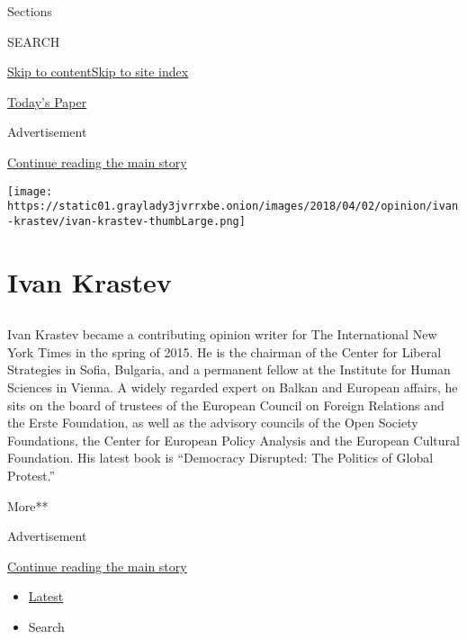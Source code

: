 Sections

SEARCH

\protect\hyperlink{site-content}{Skip to
content}\protect\hyperlink{site-index}{Skip to site index}

\href{https://myaccount.nytimes3xbfgragh.onion/auth/login?response_type=cookie\&client_id=vi}{}

\href{https://www.nytimes3xbfgragh.onion/section/todayspaper}{Today's
Paper}

Advertisement

\protect\hyperlink{after-top}{Continue reading the main story}

\texttt{[image: https://static01.graylady3jvrrxbe.onion/images/2018/04/02/opinion/ivan-krastev/ivan-krastev-thumbLarge.png]}

\hypertarget{ivan-krastev}{%
\section{Ivan Krastev}\label{ivan-krastev}}

\subsection{}

Ivan Krastev became a contributing opinion writer for The International
New York Times in the spring of 2015. He is the chairman of the Center
for Liberal Strategies in Sofia, Bulgaria, and a permanent fellow at the
Institute for Human Sciences in Vienna. A widely regarded expert on
Balkan and European affairs, he sits on the board of trustees of the
European Council on Foreign Relations and the Erste Foundation, as well
as the advisory councils of the Open Society Foundations, the Center for
European Policy Analysis and the European Cultural Foundation. His
latest book is ``Democracy Disrupted: The Politics of Global Protest.''

More**

Advertisement

\protect\hyperlink{after-mid1}{Continue reading the main story}

\begin{itemize}
\tightlist
\item
  \protect\hyperlink{stream-panel}{Latest}
\item
  Search
\end{itemize}

